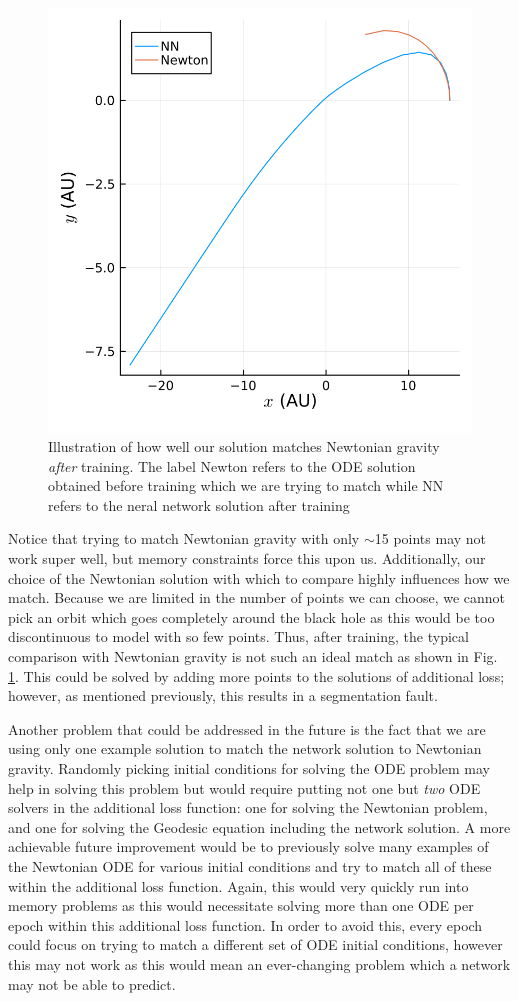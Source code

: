\documentclass{CUP-JNL-DTM}%
\theoremstyle{definition}
\numberwithin{equation}{section}
\begin{document}
\begin{figure}
    \centering
    \includegraphics[width=0.3\linewidth]{figures/compare_to_newton.png}
    \caption{Illustration of how well our solution matches Newtonian gravity \emph{after} training. The label Newton refers to the ODE solution obtained before training which we are trying to match while NN refers to the neral network solution after training}
    \label{fig:compare_newton}
\end{figure}

Notice that trying to match Newtonian gravity with only $\sim$15 points may not work super well, but memory constraints force this upon us. Additionally, our choice of the Newtonian solution with which to compare highly influences how we match. Because we are limited in the number of points we can choose, we cannot pick an orbit which goes completely around the black hole as this would be too discontinuous to model with so few points. Thus, after training, the typical comparison with Newtonian gravity is not such an ideal match as shown in Fig. \ref{fig:compare_newton}. This could be solved by adding more points to the solutions of additional loss; however, as mentioned previously, this results in a segmentation fault. 

Another problem that could be addressed in the future is the fact that we are using only one example solution to match the network solution to Newtonian gravity. Randomly picking initial conditions for solving the ODE problem may help in solving this problem but would require putting not one but \emph{two} ODE solvers in the additional loss function: one for solving the Newtonian problem, and one for solving the Geodesic equation including the network solution. A more achievable future improvement would be to previously solve many examples of the Newtonian ODE for various initial conditions and try to match all of these within the additional loss function. Again, this would very quickly run into memory problems as this would necessitate solving more than one ODE per epoch within this additional loss function. In order to avoid this, every epoch could focus on trying to match a different set of ODE initial conditions, however this may not work as this would mean an ever-changing problem which a network may not be able to predict. 
\end{document}
